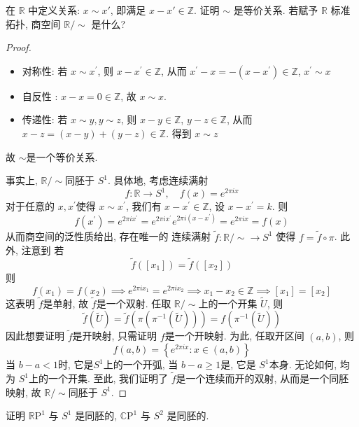 \documentclass[../main.tex]{subfiles}
\begin{document}
\begin{exercise}{}{}
在 $\mathbb{R}$ 中定义关系: $x \sim x'$, 即满足 $x - x' \in \mathbb{Z}$. 证明 $\sim$ 是等价关系.
若赋予 $\mathbb{R}$ 标准拓扑, 商空间 $\mathbb{R}/\sim$ 是什么?
\end{exercise}
\begin{proof}
    \begin{itemize}
        \item 对称性: 若 \(  x\sim x^{\prime}   \), 则  \(  x-x^{\prime} \in \mathbb{Z}   \), 从而 \(  x^{\prime} -x= -\left( x-x^{\prime}  \right)\in \mathbb{Z}    \), \(  x^{\prime} \sim x  \)
        \item 自反性 : \(  x-x=  0 \in \mathbb{Z}   \), 故 \(  x \sim x   \).
        \item 传递性: 若 \(  x\sim y, y \sim z  \), 则 \(  x-y \in \mathbb{Z}   \), \(  y-z \in \mathbb{Z}   \), 从而 \(  x-z= \left( x-y \right)+ \left( y-z \right)\in \mathbb{Z}     \). 得到 \(  x \sim z  \)       
    \end{itemize}故 \(  \sim   \)是一个等价关系.
    
    事实上,  \(  \mathbb{R} / \sim   \)同胚于 \(  S^{1}  \). 具体地, 考虑连续满射 \[
    f: \mathbb{R} \to S^{1},\quad f\left( x \right)= e^{2 \pi i x} 
    \]  对于任意的 \(  x, x^{\prime}   \)使得 \(  x \sim x^{\prime}   \), 我们有 \(  x- x^{\prime} \in \mathbb{Z}   \), 设 \(  x-x^{\prime} = k  \). 则 \[
    f\left( x^{\prime}  \right)= e^{2 \pi i x^{\prime} }= e^{2 \pi i x^{\prime}  }e^{ 2\pi i \left( x-x^{\prime} \right) }=  e^{2 \pi i x }= f\left( x \right) 
    \]    从而商空间的泛性质给出, 存在唯一的 连续满射 \(  \tilde{f}  : \mathbb{R} / \sim \to S^{1}\) 使得 \(  f= \tilde{f}\circ  \pi  \). 此外, 注意到  若  \[
    \tilde{f}\left( [x_1] \right)= \tilde{f}\left( [x_2]\right)  
    \]则 \[
    f\left( x_1 \right)= f\left( x_2 \right)\implies  e^{2 \pi i x_1}= e^{2 \pi i x_2}\implies x_1-x_2\in \mathbb{Z} \implies [x_1]= [x_2]  
    \]这表明 \(  \tilde{f}  \)是单射, 故 \(  \tilde{f}  \)是一个双射.  任取 \(  \mathbb{R} / \sim   \)上的一个开集 \(  \tilde{U}  \), 则 \[
    \tilde{f}\left( \tilde{U} \right)= \tilde{f}\left(  \pi \left(  \pi ^{-1} \left( \tilde{U} \right)  \right)  \right)= f\left(  \pi ^{-1} \left( \tilde{U} \right)  \right)   
    \]  因此想要证明 \(  \tilde{f}  \)是开映射, 只需证明 \(  f  \)是一个开映射.    为此, 任取开区间 \(  \left( a,b \right)   \), 则 \[
    f\left( a,b \right)= \left\{ e^{2 \pi ix}: x\in \left( a,b \right)  \right\} 
    \]当 \(  b-a< 1  \)时, 它是\(  S^{1}  \)上的一个开弧, 当 \(  b-a\ge 1  \)是, 它是 \(  S^{1}  \)本身. 无论如何, 均为 \(  S^{1}  \)上的一个开集.     至此, 我们证明了 \(  \tilde{f}  \)是一个连续而开的双射, 从而是一个同胚映射, 故 \(  \mathbb{R} / \sim   \)同胚于 \(  S^{1}  \).      
\end{proof}
\begin{exercise}{}{}
 证明 $\mathbb{R}\mathrm{P}^1$ 与 $S^1$ 是同胚的, $\mathbb{C}\mathrm{P}^1$ 与 $S^2$ 是同胚的.
\end{exercise}
\end{document}
